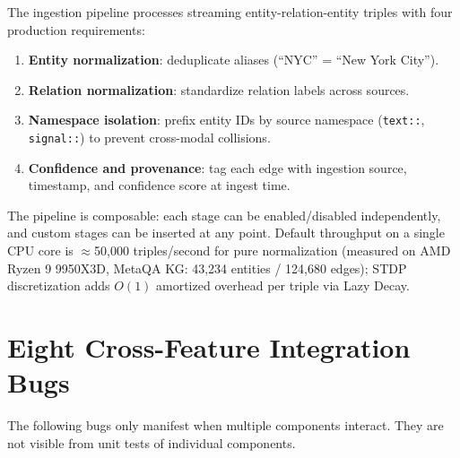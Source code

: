 \documentclass[10pt,twocolumn]{article}
\begin{document}
The \THALAMUS{} ingestion pipeline processes streaming entity-relation-entity triples
with four production requirements:

\begin{enumerate}
  \item \textbf{Entity normalization}: deduplicate aliases (``NYC'' = ``New York City'').
  \item \textbf{Relation normalization}: standardize relation labels across sources.
  \item \textbf{Namespace isolation}: prefix entity IDs by source namespace
        (\texttt{text::}, \texttt{signal::}) to prevent cross-modal collisions.
  \item \textbf{Confidence and provenance}: tag each edge with ingestion source,
        timestamp, and confidence score at ingest time.
\end{enumerate}

The pipeline is composable: each stage can be enabled/disabled independently,
and custom stages can be inserted at any point. Default throughput on a single CPU core is $\approx$50,000 triples/second for pure
normalization (measured on AMD Ryzen 9 9950X3D, MetaQA KG: 43,234 entities / 124,680 edges);
STDP discretization adds $O(1)$ amortized overhead per triple via Lazy Decay.

\section{Eight Cross-Feature Integration Bugs}
\label{sec:bugs}

The following bugs only manifest when multiple components interact. They are not visible
from unit tests of individual components.
\end{document}
